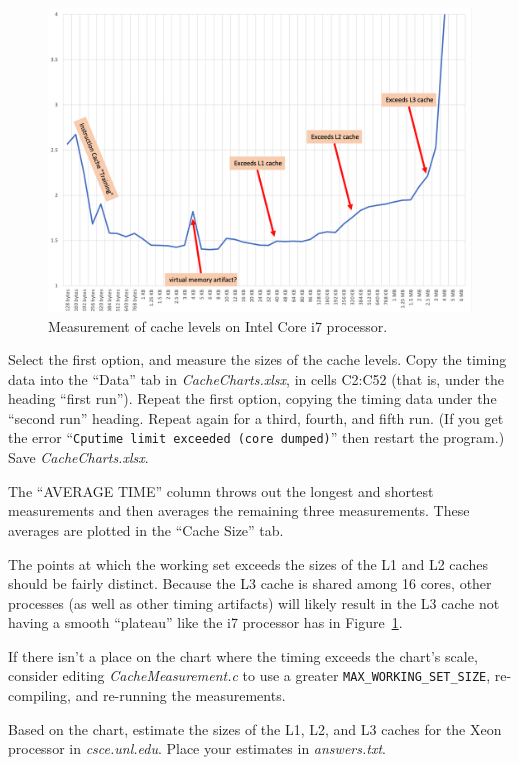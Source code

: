 \begin{figure}
    \centering
    \includegraphics[width=13cm]{IntelI7caches}
    \caption{Measurement of cache levels on Intel Core i7 processor. \label{fig:LaptopCache}}
\end{figure}

Select the first option, and measure the sizes of the cache levels. Copy the
timing data into the ``Data'' tab in \textit{CacheCharts.xlsx}, in cells C2:C52
(that is, under the heading ``first run''). Repeat the first option, copying
the timing data under the ``second run'' heading. Repeat again for a third,
fourth, and fifth run. (If you get the error ``\texttt{Cputime limit exceeded
(core dumped)}'' then restart the program.) Save \textit{CacheCharts.xlsx}.

The ``AVERAGE TIME'' column throws out the longest and shortest measurements
and then averages the remaining three measurements. These averages are plotted
in the ``Cache Size'' tab.

The points at which the working set exceeds the sizes of the L1 and L2 caches
should be fairly distinct. Because the L3 cache is shared among 16 cores, other
processes (as well as other timing artifacts) will likely result in the L3
cache not having a smooth ``plateau'' like the i7 processor has in
Figure~\ref{fig:LaptopCache}.

If there isn't a place on the chart where the timing exceeds the chart's scale,
consider editing \textit{CacheMeasurement.c} to use a greater
\lstinline{MAX_WORKING_SET_SIZE}, re-compiling, and re-running the measurements.

Based on the chart, estimate the sizes of the L1, L2, and L3 caches for the
Xeon processor in \textit{csce.unl.edu}. Place your estimates in
\textit{answers.txt}.

